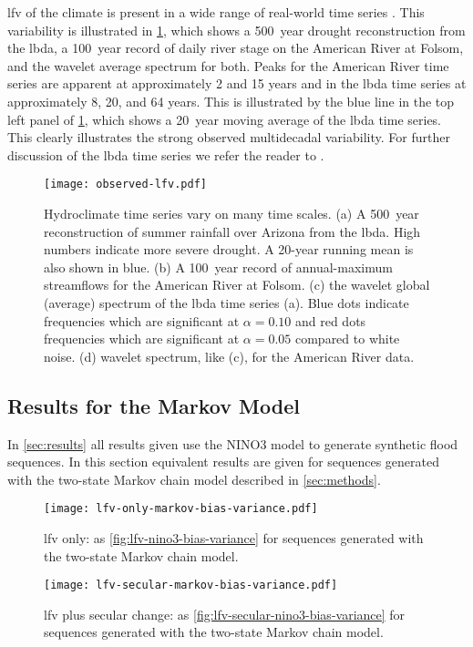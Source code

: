 \documentclass[
  draft,
  linenumbers
]{agujournal2018}
\begin{document}
\Acrfull{lfv} of the climate is present in a wide range of real-world time series \citep{Hodgkins:2017hw, Swierczynski:2012km, Cook:2010bz}.
This variability is illustrated in \cref{fig:observed-lfv}, which shows a \SI{500}{year} drought reconstruction from the \gls{lbda}, a \SI{100}{year} record of daily river stage on the American River at Folsom, and the wavelet \citep{Torrence:1998jp} average spectrum for both.
Peaks for the American River time series are apparent at approximately 2 and 15 years and in the \gls{lbda} time series at approximately 8, 20, and 64 years.
This is illustrated by the blue line in the top left panel of \cref{fig:observed-lfv}, which shows a \SI{20}{year} moving average of the \gls{lbda} time series.
This clearly illustrates the strong observed multidecadal variability.
For further discussion of the \gls{lbda} time series we refer the reader to \citet{Cook:2010bz}.
\begin{figure}
  \centering
  \texttt{[image: observed-lfv.pdf]}
  \caption{
    Hydroclimate time series vary on many time scales.
    (a) A \SI{500}{year} reconstruction of summer rainfall over Arizona from the \acrfull{lbda}.
    High numbers indicate more severe drought.
    A 20-year running mean is also shown in blue.
    (b) A \SI{100}{year} record of annual-maximum streamflows for the American River at Folsom.
    (c) the wavelet global (average) spectrum of the \gls{lbda} time series (a).
    Blue dots indicate frequencies which are significant at $\alpha=0.10$ and red dots frequencies which are significant at $\alpha=0.05$ compared to white noise.
    (d) wavelet spectrum, like (c), for the American River data.
  }\label{fig:observed-lfv}
\end{figure}

\subsection{Results for the Markov Model}

In \cref{sec:results} all results given use the NINO3 model to generate synthetic flood sequences.
In this section equivalent results are given for sequences generated with the two-state Markov chain model described in \cref{sec:methods}.

\begin{figure}
  \centering
  \texttt{[image: lfv-only-markov-bias-variance.pdf]}
  \caption{
    \Gls{lfv} only: as \cref{fig:lfv-nino3-bias-variance} for sequences generated with the two-state Markov chain model.
  }\label{fig:lfv-markov-bias-variance}
\end{figure}

\begin{figure}
  \centering
  \texttt{[image: lfv-secular-markov-bias-variance.pdf]}
  \caption{
    \Gls{lfv} plus secular change: as \cref{fig:lfv-secular-nino3-bias-variance} for sequences generated with the two-state Markov chain model.
  }\label{fig:lfv-secular-markov-bias-variance}
\end{figure}
\end{document}
